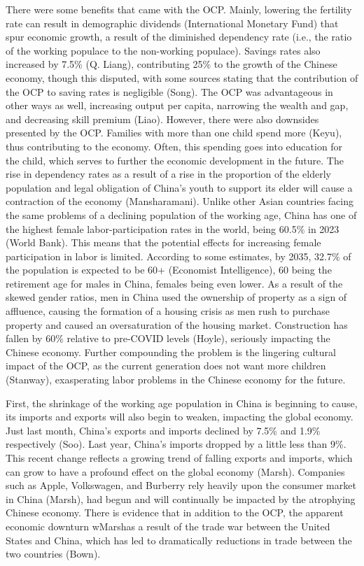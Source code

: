 There were some benefits that came with the OCP. Mainly, lowering the fertility rate can result in demographic dividends (International Monetary Fund) that spur economic growth, a result of the diminished dependency rate (i.e., the ratio of the working populace to the non-working populace). Savings rates also increased by 7.5\% (Q. Liang), contributing 25\% to the growth of the Chinese economy, though this disputed, with some sources stating that the contribution of the OCP to saving rates is negligible (Song). The OCP was advantageous in other ways as well, increasing output per capita, narrowing the wealth and gap, and decreasing skill premium (Liao). However, there were also downsides presented by the OCP.  Families with more than one child spend more (Keyu), thus contributing to the economy. Often, this spending goes into education for the child, which serves to further the economic development in the future. The rise in dependency rates as a result of a rise in the proportion of the elderly population and legal obligation of China’s youth to support its elder will cause a contraction of the economy (Mansharamani). Unlike other Asian countries facing the same problems of a declining population of the working age, China has one of the highest female labor-participation rates in the world, being 60.5\% in 2023 (World Bank). This means that the potential effects for increasing female participation in labor is limited. According to some estimates, by 2035, 32.7\% of the population is expected to be 60+ (Economist Intelligence), 60 being the retirement age for males in China, females being even lower. As a result of the skewed gender ratios, men in China used the ownership of property as a sign of affluence, causing the formation of a housing crisis as men rush to purchase property and caused an oversaturation of the housing market. Construction has fallen by 60\% relative to pre-COVID levels (Hoyle), seriously impacting the Chinese economy. Further compounding the problem is the lingering cultural impact of the OCP, as the current generation does not want more children (Stanway), exasperating labor problems in the Chinese economy for the future. 

First, the shrinkage of the working age population in China is beginning to cause, its imports and exports will also begin to weaken, impacting the global economy. Just last month, China’s exports and imports declined by 7.5\% and 1.9\% respectively (Soo). Last year, China’s imports dropped by a little less than 9\%. This recent change reflects a growing trend of falling exports and imports, which can grow to have a profound effect on the global economy (Marsh). Companies such as Apple, Volkswagen, and Burberry rely heavily upon the consumer market in China (Marsh), had begun and will continually be impacted by the atrophying Chinese economy. There is evidence that in addition to the OCP, the apparent economic downturn wMarshas a result of the trade war between the United States and China, which has led to dramatically reductions in trade between the two countries (Bown).  


